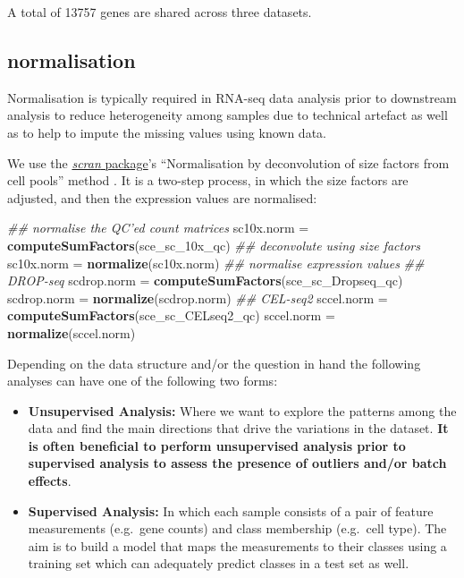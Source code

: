 \documentclass[]{book}
\newenvironment{Shaded}{\begin{snugshade}}{\end{snugshade}}
\newcommand{\CommentTok}[1]{\textcolor[rgb]{0.56,0.35,0.01}{\textit{#1}}}
\newcommand{\KeywordTok}[1]{\textcolor[rgb]{0.13,0.29,0.53}{\textbf{#1}}}
\newcommand{\NormalTok}[1]{#1}
\newcommand{\StringTok}[1]{\textcolor[rgb]{0.31,0.60,0.02}{#1}}
\theoremstyle{definition}
\theoremstyle{definition}
\theoremstyle{definition}
\theoremstyle{remark}
\begin{document}
A total of 13757 genes are shared across three datasets.

\hypertarget{normalisation}{%
\subsection{normalisation}\label{normalisation}}

Normalisation is typically required in RNA-seq data analysis prior to
downstream analysis to reduce heterogeneity among samples due to
technical artefact as well as to help to impute the missing values using
known data.

We use the
\href{http://bioconductor.org/packages/release/bioc/html/scran.html}{\emph{scran}
package}'s ``Normalisation by deconvolution of size factors from cell
pools'' method \citep{scnorm}. It is a two-step process, in which the
size factors are adjusted, and then the expression values are
normalised:

\begin{Shaded}
\begin{Highlighting}[]
\CommentTok{## normalise the QC'ed count matrices}
\NormalTok{sc10x.norm =}\StringTok{  }\KeywordTok{computeSumFactors}\NormalTok{(sce_sc_10x_qc) }\CommentTok{## deconvolute using size factors}
\NormalTok{sc10x.norm =}\StringTok{  }\KeywordTok{normalize}\NormalTok{(sc10x.norm) }\CommentTok{## normalise expression values}
\CommentTok{## DROP-seq}
\NormalTok{scdrop.norm =}\StringTok{ }\KeywordTok{computeSumFactors}\NormalTok{(sce_sc_Dropseq_qc)}
\NormalTok{scdrop.norm =}\StringTok{ }\KeywordTok{normalize}\NormalTok{(scdrop.norm)}
\CommentTok{## CEL-seq2}
\NormalTok{sccel.norm =}\StringTok{  }\KeywordTok{computeSumFactors}\NormalTok{(sce_sc_CELseq2_qc)}
\NormalTok{sccel.norm =}\StringTok{  }\KeywordTok{normalize}\NormalTok{(sccel.norm)}
\end{Highlighting}
\end{Shaded}

Depending on the data structure and/or the question in hand the
following analyses can have one of the following two forms:

\begin{itemize}
\item
  \textbf{Unsupervised Analysis:} Where we want to explore the patterns
  among the data and find the main directions that drive the variations
  in the dataset. \textbf{It is often beneficial to perform unsupervised
  analysis prior to supervised analysis to assess the presence of
  outliers and/or batch effects}.
\item
  \textbf{Supervised Analysis:} In which each sample consists of a pair
  of feature measurements (e.g.~gene counts) and class membership
  (e.g.~cell type). The aim is to build a model that maps the
  measurements to their classes using a training set which can
  adequately predict classes in a test set as well.
\end{itemize}
\end{document}
